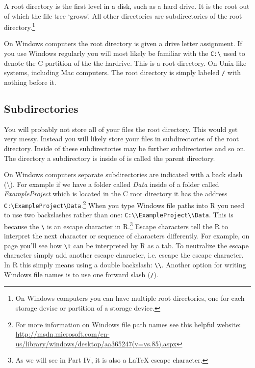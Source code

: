 {A root directory is the first level in a disk, such as a hard drive. It is the root out of which the file tree `grows'. All other directories are subdirectories of the root directory.\footnote{On Windows computers you can have multiple root directories, one for each storage devise or partition of a storage device.}


On Windows computers the root directory is given a drive letter assignment. If you use Windows regularly you will most likely be familiar with the \texttt{C:\textbackslash{}} used to denote the C partition of the the hardrive. This is a root directory. On Unix-like systems, including Mac computers. The root directory is simply labeled \texttt{/} with nothing before it.

\subsection{Subdirectories}

You will probably not store all of your files  the root directory. This would get very messy. Instead you will likely store your files in subdirectories of the root directory. Inside of these subdirectories may be further subdirectories and so on.  The directory a subdirectory is inside of is called the parent directory.

On Windows computers separate subdirectories are indicated with a back slash (\textbackslash{}). For example if we have a folder called {\emph{Data}} inside of a folder called {\emph{ExampleProject}} which is located in the C root directory it has the address \texttt{C:\textbackslash{}ExampleProject\textbackslash{}Data}.\footnote{For more information on Windows file path names see this helpful website: \url{http://msdn.microsoft.com/en-us/library/windows/desktop/aa365247(v=vs.85).aspx}} When you type Windows file paths into R you need to use two backslashes rather than one: \texttt{C:\textbackslash{}\textbackslash{}ExampleProject\textbackslash{}\textbackslash{}Data}. This is because the \texttt{\textbackslash{}} is an escape character in R.\footnote{As we will see in Part IV, it is also a LaTeX escape character.} Escape characters tell the R to interpret the next character or sequence of characters differently. For example, on page \pageref{TSVEscape} you'll see how \texttt{\textbackslash{}t} can be interpreted by R as a tab. To neutralize the escape character simply add another escape character, i.e. escape the escape character. In R this simply means using a double backslash: \texttt{\textbackslash{}\textbackslash{}}. Another option for writing Windows file names is to use one forward slash (\texttt{/}).  

}
